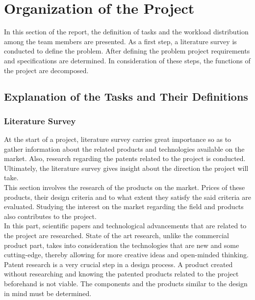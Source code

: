 \documentclass[12pt]{report}
\begin{document}
    
\section{Organization of the Project}

In this section of the report, the definition of tasks and the workload distribution among the team members are presented. As a first step, a literature survey is conducted to define the problem. After defining the problem project requirements and specifications are determined. In consideration of these steps, the functions of the project are decomposed. 

\subsection{Explanation of the Tasks and Their Definitions}

\subsubsection{Literature Survey}
At the start of a project, literature survey carries great importance so as to gather information about the related products and technologies available on the market. Also, research regarding the patents related to the project is conducted. Ultimately, the literature survey gives insight about the direction the project will take. \\

This section involves the research of the products on the market. Prices of these products, their design criteria and to what extent they satisfy the said criteria are evaluated. Studying the interest on the market regarding the field and products also contributes to the project. \\

In this part, scientific papers and technological advancements that are related to the project are researched. State of the art research, unlike the commercial product part, takes into consideration the technologies that are new and some cutting-edge, thereby allowing for more creative ideas and open-minded thinking. \\

Patent research is a very crucial step in a design process. A product created without researching and knowing the patented products related to the project beforehand is not viable. The components and the products similar to the design in mind must be determined.  
\end{document}
